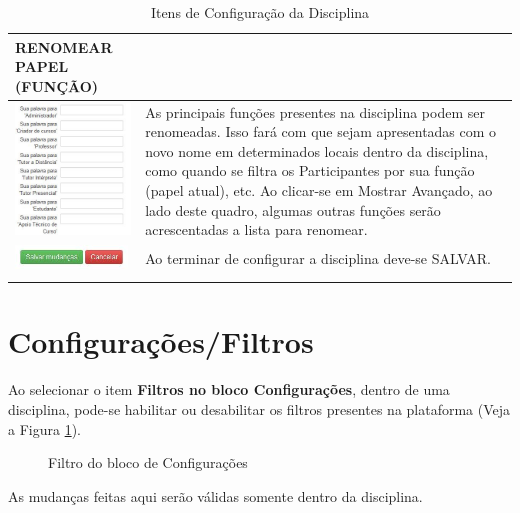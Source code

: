 \begin{longtable}[htbp] {p{6cm}|p{9cm}}
\rowcolor[rgb]{0.8,0.8,0.8} \textbf{RENOMEAR PAPEL (FUNÇÃO)}&\\\hline
 \includegraphics[width=4cm]{imagem/cap3/fig10.jpg} & As principais funções presentes na disciplina podem ser renomeadas. Isso fará com que sejam apresentadas com o novo nome em determinados locais dentro da disciplina, como quando se filtra os Participantes por sua função (papel atual), etc.
Ao clicar-se em Mostrar Avançado, ao lado deste quadro, algumas outras funções serão acrescentadas a lista para renomear.\\\hline
\includegraphics[width=3cm]{imagem/cap3/fig11.jpg} & Ao terminar de configurar a disciplina deve-se SALVAR.\\\hline
\caption{Itens de Configuração da Disciplina}
\label{tab:32}
\end{longtable}

\section{Configurações/Filtros}
Ao selecionar o item \textbf{Filtros no bloco Configurações}, dentro de uma disciplina, pode-se habilitar ou desabilitar os filtros presentes na plataforma (Veja a Figura \ref{Fig: filtroConf}).
\begin{figure}[htbp]
 \begin{center}
  \caption{Filtro do bloco de Configurações}
  \label{Fig: filtroConf}
 \end{center}
\end{figure}
As mudanças feitas aqui serão válidas somente dentro da disciplina.

